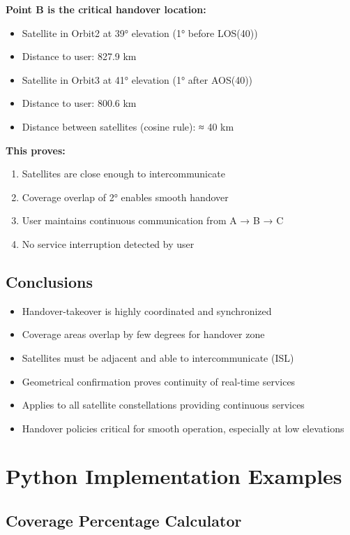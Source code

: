 \documentclass[11pt,letterpaper]{article}
\begin{document}
\textbf{Point B is the critical handover location:}
\begin{itemize}
    \item Satellite in Orbit2 at 39° elevation (1° before LOS(40))
    \item Distance to user: 827.9 km
    \item Satellite in Orbit3 at 41° elevation (1° after AOS(40))
    \item Distance to user: 800.6 km
    \item Distance between satellites (cosine rule): ≈ 40 km
\end{itemize}

\textbf{This proves:}
\begin{enumerate}
    \item Satellites are close enough to intercommunicate
    \item Coverage overlap of 2° enables smooth handover
    \item User maintains continuous communication from A → B → C
    \item No service interruption detected by user
\end{enumerate}

\subsection{Conclusions}
\begin{itemize}
    \item Handover-takeover is highly coordinated and synchronized
    \item Coverage areas overlap by few degrees for handover zone
    \item Satellites must be adjacent and able to intercommunicate (ISL)
    \item Geometrical confirmation proves continuity of real-time services
    \item Applies to all satellite constellations providing continuous services
    \item Handover policies critical for smooth operation, especially at low elevations
\end{itemize}

\section{Python Implementation Examples}

\subsection{Coverage Percentage Calculator}
\end{document}
